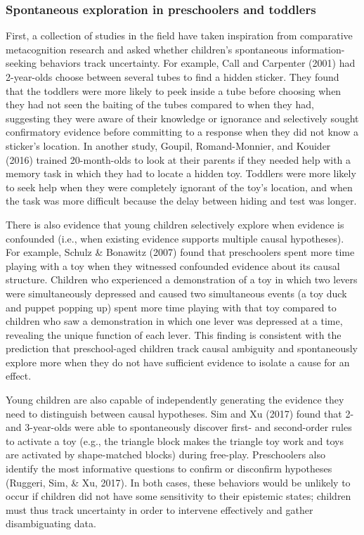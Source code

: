 \documentclass[english,man]{apa6}
\theoremstyle{definition}
\theoremstyle{definition}
\theoremstyle{definition}
\theoremstyle{remark}
\begin{document}
\subsubsection{Spontaneous exploration in preschoolers and
toddlers}\label{spontaneous-exploration-in-preschoolers-and-toddlers}

First, a collection of studies in the field have taken inspiration from
comparative metacognition research and asked whether children's
spontaneous information-seeking behaviors track uncertainty. For
example, Call and Carpenter (2001) had 2-year-olds choose between
several tubes to find a hidden sticker. They found that the toddlers
were more likely to peek inside a tube before choosing when they had not
seen the baiting of the tubes compared to when they had, suggesting they
were aware of their knowledge or ignorance and selectively sought
confirmatory evidence before committing to a response when they did not
know a sticker's location. In another study, Goupil, Romand-Monnier, and
Kouider (2016) trained 20-month-olds to look at their parents if they
needed help with a memory task in which they had to locate a hidden toy.
Toddlers were more likely to seek help when they were completely
ignorant of the toy's location, and when the task was more difficult
because the delay between hiding and test was longer.

There is also evidence that young children selectively explore when
evidence is confounded (i.e., when existing evidence supports multiple
causal hypotheses). For example, Schulz \& Bonawitz (2007) found that
preschoolers spent more time playing with a toy when they witnessed
confounded evidence about its causal structure. Children who experienced
a demonstration of a toy in which two levers were simultaneously
depressed and caused two simultaneous events (a toy duck and puppet
popping up) spent more time playing with that toy compared to children
who saw a demonstration in which one lever was depressed at a time,
revealing the unique function of each lever. This finding is consistent
with the prediction that preschool-aged children track causal ambiguity
and spontaneously explore more when they do not have sufficient evidence
to isolate a cause for an effect.

Young children are also capable of independently generating the evidence
they need to distinguish between causal hypotheses. Sim and Xu (2017)
found that 2- and 3-year-olds were able to spontaneously discover first-
and second-order rules to activate a toy (e.g., the triangle block makes
the triangle toy work and toys are activated by shape-matched blocks)
during free-play. Preschoolers also identify the most informative
questions to confirm or disconfirm hypotheses (Ruggeri, Sim, \& Xu,
2017). In both cases, these behaviors would be unlikely to occur if
children did not have some sensitivity to their epistemic states;
children must thus track uncertainty in order to intervene effectively
and gather disambiguating data.
\end{document}
